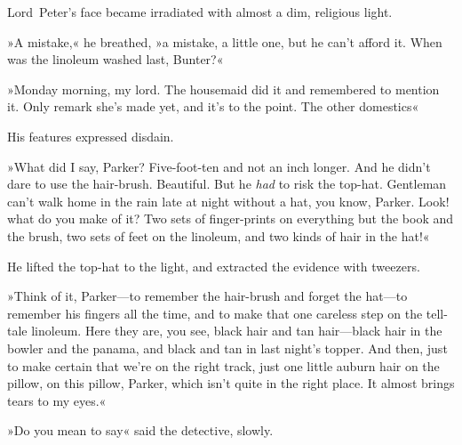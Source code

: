 Lord~Peter's face became irradiated with almost a dim, religious light.

»A mistake,« he breathed, »a mistake, a little one, but he can't afford it. When was the linoleum washed last, Bunter?«

»Monday morning, my lord. The housemaid did it and remembered to mention it. Only remark she's made yet, and it's to the point. The other domestics\longdash«

His features expressed disdain.

»What did I say, Parker? Five-foot-ten and not an inch longer. And he didn't dare to use the hair-brush. Beautiful. But he \textit{had} to risk the top-hat. Gentleman can't walk home in the rain late at night without a hat, you know, Parker. Look! what do you make of it? Two sets of finger-prints on everything but the book and the brush, two sets of feet on the linoleum, and two kinds of hair in the hat!«

He lifted the top-hat to the light, and extracted the evidence with tweezers.

»Think of it, Parker—to remember the hair-brush and forget the hat—to remember his fingers all the time, and to make that one careless step on the tell-tale linoleum. Here they are, you see, black hair and tan hair—black hair in the bowler and the panama, and black and tan in last night's topper. And then, just to make certain that we're on the right track, just one little auburn hair on the pillow, on this pillow, Parker, which isn't quite in the right place. It almost brings tears to my eyes.«

»Do you mean to say\longdash« said the detective, slowly.


